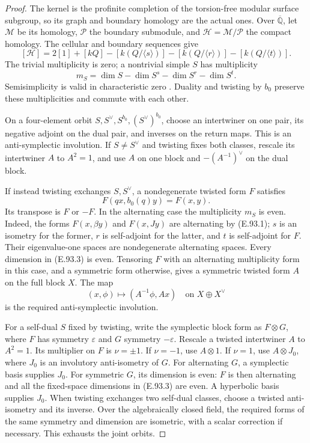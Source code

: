 \begin{proof}
The kernel is the profinite completion of the torsion-free modular
surface subgroup, so its graph and boundary homology are the actual
ones.  Over \(\overline{\mathbb Q}\), let \(\mathscr M\) be
its homology, \(\mathscr P\) the boundary submodule, and
\(\mathscr H=\mathscr M/\mathscr P\) the compact homology.
The cellular and boundary sequences give
\[
 [\mathscr H]=2[1]+[kQ]-[k(Q/\langle s\rangle)]
             -[k(Q/\langle r\rangle)]-[k(Q/\langle t\rangle)].
                                                        \tag{E.93.2}
\]
The trivial multiplicity is zero; a nontrivial simple \(S\)
has multiplicity
\[
 m_S=\dim S-\dim S^s-\dim S^r-\dim S^t.                  \tag{E.93.3}
\]
Semisimplicity is valid in characteristic zero
\citep[Theorem~7.4, p.~103]{SymMilneGT2025}.
Duality and twisting by \(b_0\) preserve these multiplicities
and commute with each other.

On a four-element orbit
\(S,S^\vee,S^{b_0},(S^\vee)^{b_0}\), choose an intertwiner
on one pair, its negative adjoint on the dual pair, and inverses
on the return maps.  This is an anti-symplectic involution.
If \(S\ne S^\vee\) and twisting fixes both classes, rescale its
intertwiner \(A\) to \(A^2=1\), and use \(A\) on one block
and \(-(A^{-1})^\vee\) on the dual block.

If instead twisting exchanges \(S,S^\vee\), a nondegenerate
twisted form \(F\) satisfies
\[
 F(qx,b_0(q)y)=F(x,y).
                                                        \tag{E.93.4}
\]
Its transpose is \(F\) or \(-F\).  In the alternating case
the multiplicity \(m_S\) is even.
Indeed, the forms \(F(x,\beta y)\) and \(F(x,Jy)\) are
alternating by (E.93.1); \(s\) is an isometry for the former,
\(r\) is self-adjoint for the latter, and \(t\) is self-adjoint
for \(F\).  Their eigenvalue-one spaces are nondegenerate
alternating spaces.  Every dimension in (E.93.3) is even.
Tensoring \(F\) with an alternating multiplicity form in this
case, and a symmetric form otherwise, gives a symmetric twisted
form \(A\) on the full block \(X\).
The map
\[
 (x,\phi)\longmapsto(A^{-1}\phi,Ax)\quad\text{on }X\oplus X^\vee
                                                        \tag{E.93.5}
\]
is the required anti-symplectic involution.

For a self-dual \(S\) fixed by twisting, write the symplectic
block form as \(F\otimes G\), where \(F\) has symmetry
\(\varepsilon\) and \(G\) symmetry \(-\varepsilon\).
Rescale a twisted intertwiner \(A\) to \(A^2=1\).
Its multiplier on \(F\) is \(\nu=\pm1\).
If \(\nu=-1\), use \(A\otimes1\).
If \(\nu=1\), use \(A\otimes J_0\), where \(J_0\) is an
involutory anti-isometry of \(G\).
For alternating \(G\), a symplectic basis supplies \(J_0\).
For symmetric \(G\), its dimension is even: \(F\) is then
alternating and all the fixed-space dimensions in (E.93.3)
are even.  A hyperbolic basis supplies \(J_0\).
When twisting exchanges two self-dual classes, choose a twisted
anti-isometry and its inverse.  Over the algebraically closed
field, the required forms of the same symmetry and dimension
are isometric, with a scalar correction if necessary.
This exhausts the joint orbits.


\end{proof}
